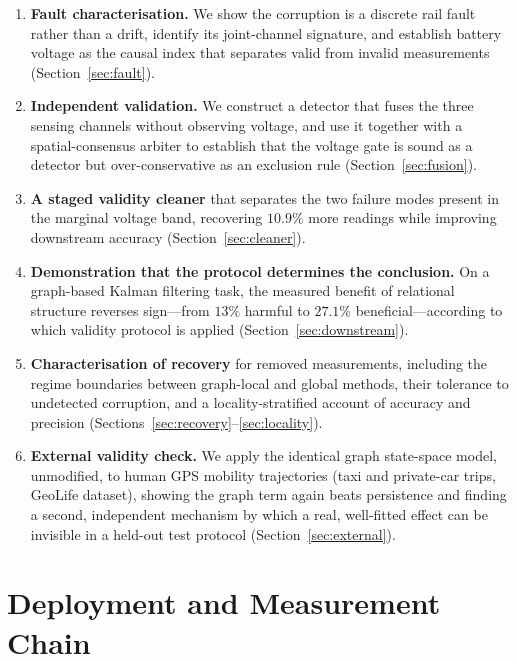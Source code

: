 \documentclass[conference]{IEEEtran}
\begin{document}
\begin{enumerate}
\item \textbf{Fault characterisation.} We show the corruption is a discrete
rail fault rather than a drift, identify its joint-channel signature, and
establish battery voltage as the causal index that separates valid from invalid
measurements (Section~\ref{sec:fault}).

\item \textbf{Independent validation.} We construct a detector that fuses the
three sensing channels without observing voltage, and use it together with a
spatial-consensus arbiter to establish that the voltage gate is sound as a
detector but over-conservative as an exclusion rule
(Section~\ref{sec:fusion}).

\item \textbf{A staged validity cleaner} that separates the two failure modes
present in the marginal voltage band, recovering $10.9\%$ more readings while
improving downstream accuracy (Section~\ref{sec:cleaner}).

\item \textbf{Demonstration that the protocol determines the conclusion.} On a
graph-based Kalman filtering task, the measured benefit of relational structure
reverses sign---from $13\%$ harmful to $27.1\%$ beneficial---according to which
validity protocol is applied (Section~\ref{sec:downstream}).

\item \textbf{Characterisation of recovery} for removed measurements, including
the regime boundaries between graph-local and global methods, their tolerance
to undetected corruption, and a locality-stratified account of accuracy and
precision (Sections~\ref{sec:recovery}--\ref{sec:locality}).

\item \textbf{External validity check.} We apply the identical graph
state-space model, unmodified, to human GPS mobility trajectories (taxi and
private-car trips, GeoLife dataset), showing the graph term again beats
persistence and finding a second, independent mechanism by which a real,
well-fitted effect can be invisible in a held-out test protocol
(Section~\ref{sec:external}).
\end{enumerate}

\section{Deployment and Measurement Chain}
\label{sec:deployment}
\end{document}
